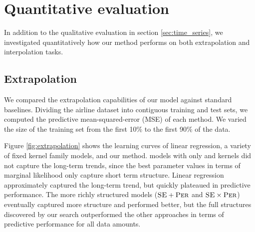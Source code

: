 \documentclass[twoside]{article}
\renewcommand{\fTBD}[1]{}
\begin{document}
\section{Quantitative evaluation}
\label{sec:quantitative}

In addition to the qualitative evaluation in section \ref{sec:time_series}, we investigated quantitatively how our method performs on both extrapolation and interpolation tasks.

\subsection{Extrapolation}

We compared the extrapolation capabilities of our model against standard baselines.  
Dividing the airline dataset into contiguous training and test sets, we computed the predictive mean-squared-error (MSE) of each method.  
We varied the size of the training set from the first 10\% to the first 90\% of the data.

Figure \ref{fig:extrapolation} shows the learning curves of linear regression, a variety of fixed kernel family \gp{} models, and our method.  
\gp{} models with only \kSE{} and \kPer{} kernels did not capture the long-term trends, since the best parameter values in terms of \gp{} marginal likelihood only capture short term structure. 
Linear regression approximately captured the long-term trend, but quickly plateaued in predictive performance.
The more richly structured \gp{} models (${{\textsc{SE}} + {\textsc{Per}}}$ and ${{\textsc{SE}} \times {\textsc{Per}}}$) eventually captured more structure and performed better, but the full structures discovered by our search outperformed the other approaches in terms of predictive performance for all data amounts.

\end{document}
